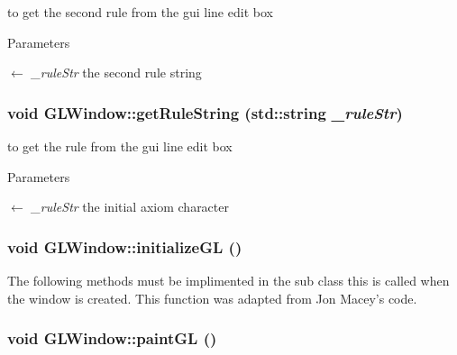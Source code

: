 to get the second rule from the gui line edit box 
\begin{DoxyParams}{Parameters}
\item[\mbox{$\leftarrow$} {\em \_\-ruleStr}]the second rule string \end{DoxyParams}
\hypertarget{classGLWindow_acf22215731822fcd7d460bd1e6c3d312}{
\subsubsection[{getRuleString}]{\setlength{\rightskip}{0pt plus 5cm}void GLWindow::getRuleString (std::string {\em \_\-ruleStr})}}
\label{classGLWindow_acf22215731822fcd7d460bd1e6c3d312}


to get the rule from the gui line edit box 
\begin{DoxyParams}{Parameters}
\item[\mbox{$\leftarrow$} {\em \_\-ruleStr}]the initial axiom character \end{DoxyParams}
\hypertarget{classGLWindow_a39e39761cd7323806917a217cc7caea5}{
\subsubsection[{initializeGL}]{\setlength{\rightskip}{0pt plus 5cm}void GLWindow::initializeGL ()}}
\label{classGLWindow_a39e39761cd7323806917a217cc7caea5}


The following methods must be implimented in the sub class this is called when the window is created. This function was adapted from Jon Macey's code. \hypertarget{classGLWindow_a9bd2503dd5f812c10a9481f22ecd3403}{
\subsubsection[{paintGL}]{\setlength{\rightskip}{0pt plus 5cm}void GLWindow::paintGL ()}}
\label{classGLWindow_a9bd2503dd5f812c10a9481f22ecd3403}


